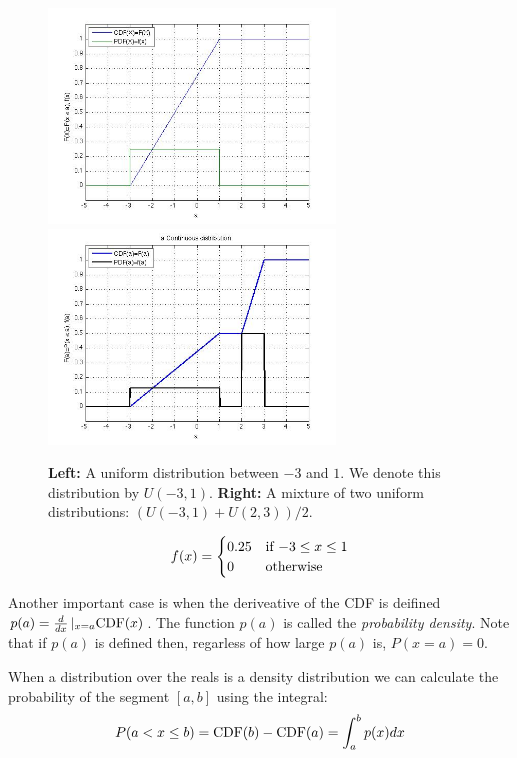 \documentclass{report}
\theoremstyle{plain}
\theoremstyle{definition}
\begin{document}
\begin{figure}[t]
\begin{center}
\includegraphics[width=3in]{figs/Uniform.jpg}
\includegraphics[width=3in]{figs/unifMixture2CDF.jpg}
\end{center}
\caption{{\bf Left:} A uniform distribution between $-3$ and $1$. We
  denote this distribution by $U(-3,1)$. {\bf Right:} A mixture of two
  uniform distributions: $(U(-3,1)+U(2,3))/2$.}
\end{figure}

\[
f(x) = \begin{cases}
0.25 & \mbox{if $ -3 \leq x \leq 1$} \\
0 & \mbox{otherwise}
\end{cases}
\]

Another important case is when the deriveative of the CDF is deifined
$p(a) = \frac{d}{dx}\left|_{x=a} \mbox{CDF}(x)\right.$. The function $p(a)$
is called the {\em probability density}. Note that if $p(a)$ is
defined then, regarless of how large $p(a)$ is, $P(x=a)=0$.

When a distribution over the reals is a density distribution we can
calculate the probability of the segment $[a,b]$ using the integral:
\[
P(a < x \leq b)=\mbox{CDF}(b)-\mbox{CDF}(a)=\int_a^b p(x) dx
\]
\end{document}
